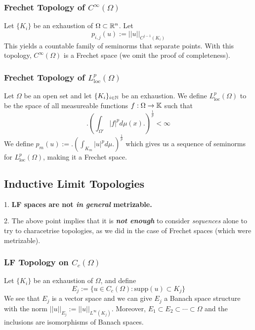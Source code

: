 \subsubsection{Frechet Topology of $C^{\infty}(\Omega)$}
Let $\{K_i\}$ be an exhaustion of $\Omega\subset \mathbb{R}^n$. Let $$p_{i,j}(u):=||u||_{C^{j-1}(K_i)}$$
This yields a countable family of seminorms that separate points. With this topology, $C^{\infty}(\Omega)$ is a Frechet space (we omit the proof of completeness). 

\subsubsection{Frechet Topology of $L^p_{\mathrm{loc}}(\Omega)$}
Let $\Omega$ be an open set and let $\{K_i\}_{i\in \mathbb{N}}$ be an exhaustion. We define $L^p_{\mathrm{loc}}(\Omega)$ to be the space of all measureable functions $f: \Omega\to \mathbb{K}$ such that \begin{equation}
    \big.(\int_{\Omega'} |f|^p d\mu(x)\big.)^{\frac{1}{p}}<\infty
\end{equation}
We define $p_m(u):=\Bigg.(\int_{K_m}|u|^{p} d\mu \Bigg.)^{\frac{1}{p}} $ which gives us a sequence of seminorms for $L^p_{\mathrm{loc}}(\Omega)$, making it a Frechet space.
\subsection{Inductive Limit Topologies}
\begin{remark}
    1. \textbf{LF spaces are not \emph{in general} metrizable.}
    
    2. The above point implies that it is \emph{\textbf{not enough}} to consider \emph{sequences} alone to try to characetrise topologies, as we did in the case of Frechet spaces (which were metrizable).
\end{remark}
\subsubsection{LF Topology on $C_c(\Omega)$}
Let $\{K_i\}$ be an exhaustion of $\Omega$, and define $$E_j:=\{u\in C_c(\Omega):\mathrm{supp}(u)\subset K_j\}$$
We see that $E_j$ is a vector space and we can give $E_j$ a Banach space structure with the norm $||u||_{E_j}:=||u||_{L^{\infty}(K_j)}$. Moreover, $E_1\subset E_2\subset \cdots \subset \Omega$ and the inclusions are isomorphisms of Banach spaces. 

